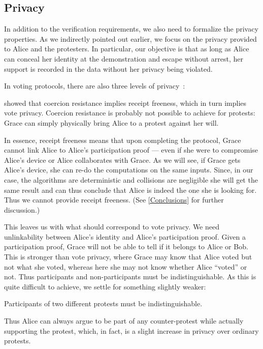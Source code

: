 \subsection{Privacy}%
\label{Privacy}

In addition to the verification requirements, we also need to formalize the privacy properties.
As we indirectly pointed out earlier, we focus on the privacy provided to Alice and the protesters.
In particular, our objective is that as long as Alice can conceal her identity 
at the demonstration and escape without arrest, her support is recorded in the 
data without her privacy being violated.

In voting protocols, there are also three levels of privacy~\cite{VerifyingPrivacyPropertiesOfVotingProtocols}:
 showed that coercion 
resistance implies receipt freeness, which in turn implies vote privacy.
Coercion resistance is probably not possible to achieve for protests:
\eg Grace can simply physically bring Alice to a protest against her will.

In essence, receipt freeness means that upon completing the protocol, Grace 
cannot link Alice to Alice's participation proof --- even if she were to 
compromise Alice's device or Alice collaborates with Grace.
As we will see, if Grace gets Alice's device, she can re-do the computations on 
the same inputs.
Since, in our case, the algorithms are deterministic and collisions are 
negligible she will get the same result and can thus conclude that Alice is 
indeed the one she is looking for.
Thus we cannot provide receipt freeness.
(See \cref{Conclusions} for further discussion.)

This leaves us with what should correspond to vote privacy.
We need unlinkability between Alice's identity and Alice's participation proof.
Given a participation proof, Grace will not be able to tell if it belongs to 
Alice or Bob.
This is stronger than vote privacy, where Grace may know that Alice voted but 
not what she voted, whereas here she may not know whether Alice \enquote{voted} 
or not.
Thus participants and non-participants must be indistinguishable.
As this is quite difficult to achieve, we settle for something slightly weaker:
\begin{requirements}[P]
\item\label{ProtestInd} Participants of two different protests must be 
  indistinguishable.
\end{requirements}
Thus Alice can always argue to be part of any counter-protest while actually 
supporting the protest, which, in fact, is a slight increase in privacy over 
ordinary protests.

